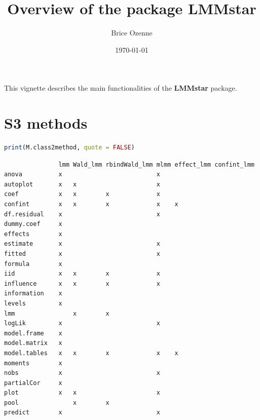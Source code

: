 \documentclass[12pt]{article}
\author{Brice Ozenne}
\date{\today}
\title{Overview of the package LMMstar}
\begin{document}
\maketitle
This vignette describes the main functionalities of the \textbf{LMMstar}
package.
\section{S3 methods}
\label{sec:org375add6}

\begin{lstlisting}[language=r,numbers=none]
print(M.class2method, quote = FALSE)
\end{lstlisting}

\label{}
\begin{verbatim}
               lmm Wald_lmm rbindWald_lmm mlmm effect_lmm confint_lmm
anova          x                          x                          
autoplot       x   x                      x                          
coef           x   x        x             x                          
confint        x   x        x             x    x                     
df.residual    x                          x                          
dummy.coef     x                                                     
effects        x                                                     
estimate       x                          x                          
fitted         x                          x                          
formula        x                                                     
iid            x   x        x             x                          
influence      x   x        x             x                          
information    x                                                     
levels         x                                                     
lmm                x        x                                        
logLik         x                          x                          
model.frame    x                                                     
model.matrix   x                                                     
model.tables   x   x        x             x    x                     
moments        x                                                     
nobs           x                          x                          
partialCor     x                                                     
plot           x   x                      x                          
pool               x        x                                        
predict        x                          x                          

\end{verbatim}
\end{document}
